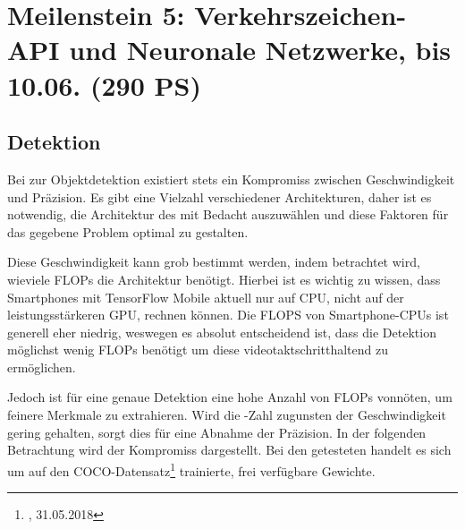 \documentclass[12pt,a4paper,ngerman,enabledeprecatedfontcommands]{scrreprt}
\begin{document}
\section[Meilenstein 5: Verkehrszeichen-API und Neuronale Netzwerke]{Meilenstein 5: Verkehrszeichen-API und Neuronale Netzwerke, bis 10.06. (290 PS)}
\subsection{Detektion}
Bei  zur Objektdetektion existiert stets ein Kompromiss zwischen Geschwindigkeit und Präzision. Es gibt eine Vielzahl verschiedener Architekturen, daher ist es notwendig, die Architektur des  mit Bedacht auszuwählen und diese Faktoren für das gegebene Problem optimal zu gestalten. 

Diese Geschwindigkeit kann grob bestimmt werden, indem betrachtet wird, wieviele \gls{FLOPs} die Architektur benötigt.
Hierbei ist es wichtig zu wissen, dass Smartphones mit TensorFlow Mobile aktuell nur auf \gls{CPU}, nicht auf der leistungsstärkeren \gls{GPU}, rechnen können.
Die \gls{FLOPS} von Smartphone-\gls{CPU}s ist generell eher niedrig, weswegen es absolut entscheidend ist, dass die \gls{Detektion} möglichst wenig \gls{FLOPs} benötigt um diese videotaktschritthaltend zu ermöglichen.

Jedoch ist für eine genaue \gls{Detektion} eine hohe Anzahl von \gls{FLOPs} vonnöten, um feinere Merkmale zu extrahieren. Wird die -Zahl zugunsten der Geschwindigkeit gering gehalten, sorgt dies für eine Abnahme der Präzision.
In der folgenden Betrachtung wird der Kompromiss dargestellt.
Bei den getesteten  handelt es sich um auf den COCO-Datensatz\footnote{, 31.05.2018} trainierte, frei verfügbare Gewichte.\\
\setcounter{n}{\value{footnote}}
\end{document}
